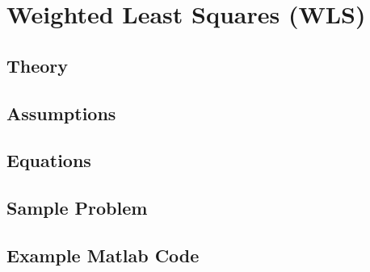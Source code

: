 \section{Weighted Least Squares (WLS)}
\subsection{Theory}
\subsection{Assumptions}
\subsection{Equations}
\subsection{Sample Problem}
\subsection{Example Matlab Code}


